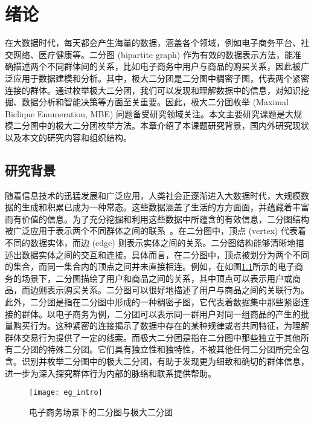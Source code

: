 \chapter{绪论}

在大数据时代，每天都会产生海量的数据，涵盖各个领域，例如电子商务平台、社交网络、医疗健康等。二分图 (bipartite graph) 作为有效的数据表示方法，能准确描述两个不同群体间的关系，比如电子商务中用户与商品的购买关系，因此被广泛应用于数据建模和分析。其中，极大二分团是二分图中稠密子图，代表两个紧密连接的群体。通过枚举极大二分团，我们可以发现和理解数据中的信息，对知识挖掘、数据分析和智能决策等方面至关重要。因此，极大二分团枚举 (Maximal Biclique Enumeration, MBE) 问题备受研究领域关注。本文主要研究课题是大规模二分图中的极大二分团枚举方法。本章介绍了本课题研究背景，国内外研究现状以及本文的研究内容和组织结构。

\section{研究背景}

随着信息技术的迅猛发展和广泛应用，人类社会正逐渐进入大数据时代，大规模数据的生成和积累已成为一种常态。这些数据涵盖了生活的方方面面，并蕴藏着丰富而有价值的信息。为了充分挖掘和利用这些数据中所蕴含的有效信息，二分图结构被广泛应用于表示两个不同群体之间的联系~\cite{bipartite22}。在二分图中，顶点 (vertex) 代表着不同的数据实体，而边 (edge) 则表示实体之间的关系。二分图结构能够清晰地描述出数据实体之间的交互和连接。具体而言，在二分图中，顶点被划分为两个不同的集合，而同一集合内的顶点之间并未直接相连。例如，在如图\ref{fig:eg_intro}所示的电子商务的场景下，二分图描绘了用户和商品之间的关系，其中顶点可以表示用户或商品，而边则表示购买关系。二分图可以很好地描述了用户与商品之间的关联行为。此外，二分团是指在二分图中形成的一种稠密子图，它代表着数据集中那些紧密连接的群体。以电子商务为例，二分团可以表示同一群用户对同一组商品的产生的批量购买行为。这种紧密的连接揭示了数据中存在的某种规律或者共同特征，为理解群体交易行为提供了一定的线索。而极大二分团是指在二分图中那些独立于其他所有二分团的特殊二分团。它们具有独立性和独特性，不被其他任何二分团所完全包含。识别并枚举二分图中的极大二分团，有助于发现更为细致和确切的群体信息，进一步为深入探究群体行为内部的脉络和联系提供帮助。

\begin{figure} [ht]
  \centering
  \texttt{[image: eg\_intro]}
  \caption{电子商务场景下的二分图与极大二分团}
  \label{fig:eg_intro}
\end{figure}


